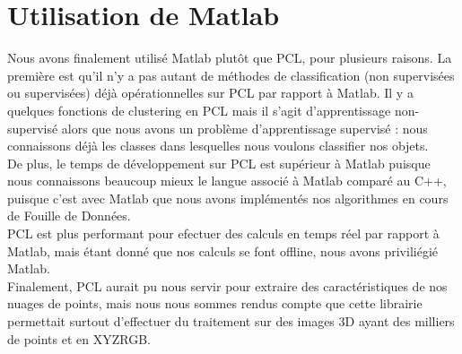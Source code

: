 \section{Utilisation de Matlab}

	Nous avons finalement utilisé Matlab plutôt que PCL, pour plusieurs raisons. La première est qu'il n'y a pas autant de méthodes de classification (non supervisées ou supervisées) déjà opérationnelles sur PCL par rapport à Matlab. Il y a quelques fonctions de clustering en PCL mais il s'agit d'apprentissage non-supervisé alors que nous avons un problème d'apprentissage supervisé : nous connaissons déjà les classes dans lesquelles nous voulons classifier nos objets.\\

	De plus, le temps de développement sur PCL est supérieur à Matlab puisque nous connaissons beaucoup mieux le langue associé à Matlab comparé au C++, puisque c'est avec Matlab que nous avons implémentés nos algorithmes en cours de Fouille de Données. \\

	PCL est plus performant pour efectuer des calculs en temps réel par rapport à Matlab, mais étant donné que nos calculs se font offline, nous avons priviliégié Matlab. \\

	Finalement, PCL aurait pu nous servir pour extraire des caractéristiques de nos nuages de points, mais nous nous sommes rendus compte que cette librairie permettait surtout d'effectuer du traitement sur des images 3D ayant des milliers de points et en XYZRGB.\\

